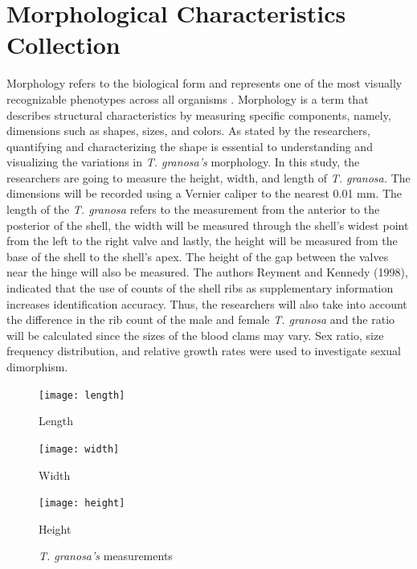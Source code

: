 \section{Morphological Characteristics Collection}
\label{sec:morphochar}

Morphology refers to the biological form and represents one of the most visually recognizable phenotypes across all organisms \cite{tsutsumi2023}. Morphology is a term that describes structural characteristics by measuring specific components, namely, dimensions such as shapes, sizes, and colors. As stated by the researchers, quantifying and characterizing the shape is essential to understanding and visualizing the variations in \textit{T. granosa’s} morphology. 
In this study, the researchers are going to measure the height, width, and length of \textit{T. granosa.} The dimensions will be recorded using a Vernier caliper to the nearest 0.01 mm. The length of the \textit{T. granosa} refers to the measurement from the anterior to the posterior of the shell, the width will be measured through the shell’s widest point from the left to the right valve and lastly, the height will be measured from the base of the shell to the shell’s apex. The height of the gap between the valves near the hinge will also be measured. The authors Reyment and Kennedy (1998), indicated that the use of counts of the shell ribs as supplementary information increases identification accuracy. Thus, the researchers will also take into account the difference in the rib count of the male and female \textit{T. granosa} and the ratio will be calculated since the sizes of the blood clams may vary.
Sex ratio, size frequency distribution, and relative growth rates were used to investigate sexual dimorphism.

\begin{figure}
	\centering
	\begin{minipage}[b]{0.24\textwidth}
		\centering
		\texttt{[image: length]}
		\caption{Length}
	\end{minipage}\hspace{0.4cm}
	\begin{minipage}[b]{0.24\textwidth}
		\texttt{[image: width]}
		\caption{Width}
	\end{minipage}\hspace{0.4cm}
	\begin{minipage}[b]{0.24\textwidth}
		\texttt{[image: height]}
		\caption{Height}
	\end{minipage}
	\caption{\textit{T. granosa’s} measurements}\label{fig:tegillarca}
\end{figure}

